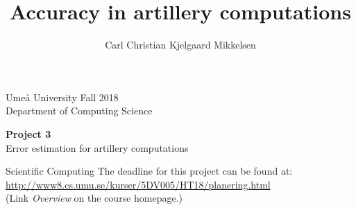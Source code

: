 \documentclass[a4paper,12pt]{article}
\title{Accuracy in artillery computations}
\author{Carl Christian Kjelgaard Mikkelsen}
\begin{document}
 


\thispagestyle{empty}

\noindent
Ume\aa{} University \hfill Fall 2018 \\
Department of Computing Science\\

\vskip 2.5cm

\begin{center} {\Huge {\bf Project 3}}\\{\LARGE Error estimation for artillery computations}\end{center} \vskip 0.3cm
\begin{center}
  {\huge Scientific Computing}
  \vfill
  {\Large The deadline for this project can be found at: \href{http://www8.cs.umu.se/kurser/5DV005/HT18/planering.html}{http://www8.cs.umu.se/kurser/5DV005/HT18/planering.html}\\
    (Link \emph{Overview} on the course homepage.)}
\end{center}
\vfill
\end{document}
